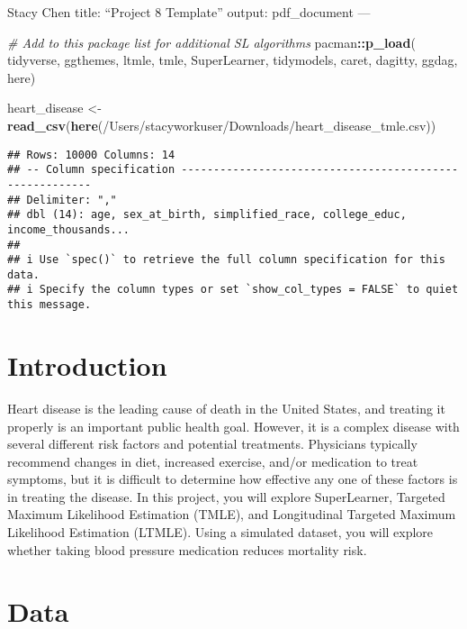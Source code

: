 \documentclass[
]{article}
\author{}
\date{\vspace{-2.5em}}
\newenvironment{Shaded}{\begin{snugshade}}{\end{snugshade}}
\newcommand{\CommentTok}[1]{\textcolor[rgb]{0.56,0.35,0.01}{\textit{#1}}}
\newcommand{\FunctionTok}[1]{\textcolor[rgb]{0.13,0.29,0.53}{\textbf{#1}}}
\newcommand{\NormalTok}[1]{#1}
\newcommand{\OtherTok}[1]{\textcolor[rgb]{0.56,0.35,0.01}{#1}}
\newcommand{\SpecialCharTok}[1]{\textcolor[rgb]{0.81,0.36,0.00}{\textbf{#1}}}
\newcommand{\StringTok}[1]{\textcolor[rgb]{0.31,0.60,0.02}{#1}}
\begin{document}
Stacy Chen title: ``Project 8 Template'' output: pdf\_document ---

\begin{Shaded}
\begin{Highlighting}[]
\CommentTok{\# Add to this package list for additional SL algorithms}
\NormalTok{pacman}\SpecialCharTok{::}\FunctionTok{p\_load}\NormalTok{(}
\NormalTok{  tidyverse,}
\NormalTok{  ggthemes,}
\NormalTok{  ltmle,}
\NormalTok{  tmle,}
\NormalTok{  SuperLearner,}
\NormalTok{  tidymodels,}
\NormalTok{  caret,}
\NormalTok{  dagitty,}
\NormalTok{  ggdag,}
\NormalTok{  here)}

\NormalTok{heart\_disease }\OtherTok{\textless{}{-}} \FunctionTok{read\_csv}\NormalTok{(}\FunctionTok{here}\NormalTok{(}\StringTok{\textquotesingle{}/Users/stacyworkuser/Downloads/heart\_disease\_tmle.csv\textquotesingle{}}\NormalTok{))}
\end{Highlighting}
\end{Shaded}

\begin{verbatim}
## Rows: 10000 Columns: 14
## -- Column specification --------------------------------------------------------
## Delimiter: ","
## dbl (14): age, sex_at_birth, simplified_race, college_educ, income_thousands...
## 
## i Use `spec()` to retrieve the full column specification for this data.
## i Specify the column types or set `show_col_types = FALSE` to quiet this message.
\end{verbatim}

\section{Introduction}\label{introduction}

Heart disease is the leading cause of death in the United States, and
treating it properly is an important public health goal. However, it is
a complex disease with several different risk factors and potential
treatments. Physicians typically recommend changes in diet, increased
exercise, and/or medication to treat symptoms, but it is difficult to
determine how effective any one of these factors is in treating the
disease. In this project, you will explore SuperLearner, Targeted
Maximum Likelihood Estimation (TMLE), and Longitudinal Targeted Maximum
Likelihood Estimation (LTMLE). Using a simulated dataset, you will
explore whether taking blood pressure medication reduces mortality risk.

\section{Data}\label{data}
\end{document}
